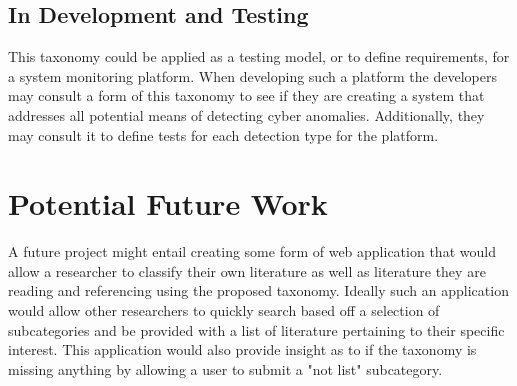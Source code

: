 \documentclass[10pt]{IEEEtran}
\begin{document}
\subsection{In Development and Testing}
This taxonomy could be applied as a testing model, or to define requirements, for a system monitoring platform. When developing such a platform the developers may consult a form of this taxonomy to see if they are creating a system that addresses all potential means of detecting cyber anomalies. Additionally, they may consult it to define tests for each detection type for the platform.

\section{Potential Future Work}
A future project might entail creating some form of web application that would allow a researcher to classify their own literature as well as literature they are reading and referencing using the proposed taxonomy. Ideally such an application would allow other researchers to quickly search based off a selection of subcategories and be provided with a list of literature pertaining to their specific interest. This application would also provide insight as to if the taxonomy is missing anything by allowing a user to submit a "not list" subcategory.
\end{document}
